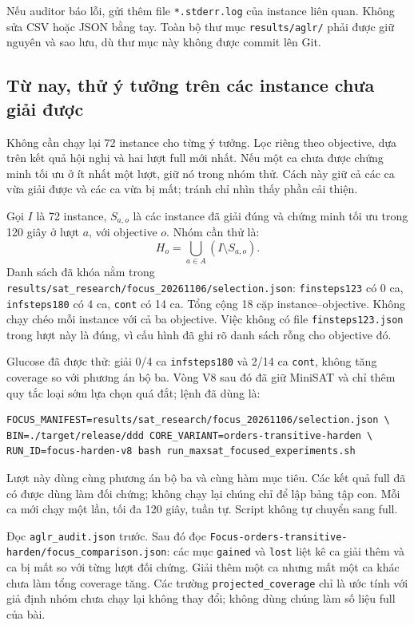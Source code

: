\documentclass[11pt,a4paper]{article}
\newcommand{\code}[1]{\texttt{#1}}
\newcommand{\file}[1]{\nolinkurl{#1}}
\begin{document}
Nếu auditor báo lỗi, gửi thêm file \code{*.stderr.log} của instance liên quan.
Không sửa CSV hoặc JSON bằng tay. Toàn bộ thư mục \file{results/aglr/} phải được
giữ nguyên và sao lưu, dù thư mục này không được commit lên Git.

\subsection{Từ nay, thử ý tưởng trên các instance chưa giải được}

Không cần chạy lại 72 instance cho từng ý tưởng. Lọc riêng theo objective,
dựa trên kết quả hội nghị và hai lượt full mới nhất. Nếu một ca chưa được
chứng minh tối ưu ở ít nhất một lượt, giữ nó trong nhóm thử. Cách này giữ cả
các ca vừa giải được và các ca vừa bị mất; tránh chỉ nhìn thấy phần cải thiện.

Gọi $I$ là 72 instance, $S_{a,o}$ là các instance đã giải đúng và chứng minh
tối ưu trong 120 giây ở lượt $a$, với objective $o$. Nhóm cần thử là:
\[
H_o=\bigcup_{a\in A}(I\setminus S_{a,o}).
\]
Danh sách đã khóa nằm trong
\file{results/sat_research/focus_20261106/selection.json}:
\code{finsteps123} có 0 ca, \code{infsteps180} có 4 ca, \code{cont} có 14 ca.
Tổng cộng 18 cặp instance--objective. Không chạy chéo mỗi instance với cả
ba objective. Việc không có file \code{finsteps123.json} trong lượt này là
đúng, vì cấu hình đã ghi rõ danh sách rỗng cho objective đó.

Glucose đã được thử: giải 0/4 ca \code{infsteps180} và 2/14 ca \code{cont},
không tăng coverage so với phương án bộ ba. Vòng V8 sau đó đã giữ MiniSAT
và chỉ thêm quy tắc loại sớm lựa chọn quá đắt; lệnh đã dùng là:

\begin{verbatim}
FOCUS_MANIFEST=results/sat_research/focus_20261106/selection.json \
BIN=./target/release/ddd CORE_VARIANT=orders-transitive-harden \
RUN_ID=focus-harden-v8 bash run_maxsat_focused_experiments.sh
\end{verbatim}

Lượt này dùng cùng phương án bộ ba và cùng hàm mục tiêu. Các kết quả full đã có được dùng làm
đối chứng; không chạy lại chúng chỉ để lập bảng tập con. Mỗi ca mới chạy một
lần, tối đa 120 giây, tuần tự. Script không tự chuyển sang full.

Đọc \file{aglr_audit.json} trước. Sau đó đọc
\file{Focus-orders-transitive-harden/focus_comparison.json}: các mục
\code{gained} và \code{lost} liệt kê ca giải thêm và ca bị mất so với từng
lượt đối chứng. Giải thêm một ca nhưng mất một ca khác chưa làm tổng coverage
tăng. Các trường \code{projected\_coverage} chỉ là ước tính với giả định
nhóm chưa chạy lại không thay đổi; không dùng chúng làm số liệu full của bài.
\end{document}
